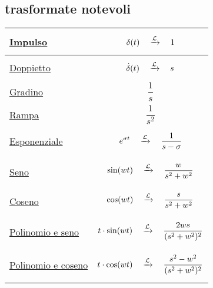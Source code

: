 \documentclass[../main.tex]{subfiles}
\begin{document}
	\subsection{trasformate notevoli}
	\begin{tabular}{|>{\centering\arraybackslash}m{1.5in}|>{\centering\arraybackslash}m{4.5in}|}
		\hline
		\hyperref[trasf_impulso]{Impulso}& $$ \delta (t) \quad \xrightarrow{\mathcal{L}} \quad 1 $$\\
		\hline
		\hyperref[trasf_doppietto]{Doppietto} & $$ \dot{\delta}(t) \quad \xrightarrow{\mathcal{L}} \quad s $$\\
		\hline
		\hyperref[trasf_gradino]{Gradino} & $$ \frac{1}{s} $$\\
		\hline
		\hyperref[trasf_rampa]{Rampa} & $$ \frac{1}{s^2} $$\\
		\hline
		\hyperref[trasf_esponenziale]{Esponenziale} & $$ e^{\sigma t} \quad \xrightarrow{\mathcal{L}} \quad \frac{1}{s-\sigma} $$\\
		\hline
		\hyperref[trasf_seno]{Seno} & $$ \sin(wt) \quad \xrightarrow{\mathcal{L}} \quad \frac{w}{s^2+w^2} $$\\
		\hline
		\hyperref[trasf_coseno]{Coseno} & $$ \cos(wt) \quad \xrightarrow{\mathcal{L}} \quad \frac{s}{s^2+w^2} $$\\
		\hline
		\hyperref[trasf_t_seno]{Polinomio e seno} & $$ t \cdot \sin(wt) \quad \xrightarrow{\mathcal{L}} \quad \frac{2ws}{(s^2+w^2)^2} $$\\
		\hline
		\hyperref[trasf_t_coseno]{Polinomio e coseno} & $$ t \cdot \cos(wt) \quad \xrightarrow{\mathcal{L}} \quad \frac{s^2-w^2}{(s^2+w^2)^2} $$\\
		\hline
	\end{tabular}
\end{document}
